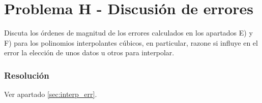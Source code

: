 \section{Problema H - Discusión de errores}

Discuta los órdenes de magnitud de los errores calculados en los apartados E) y F) para los polinomios interpolantes cúbicos, en particular, razone si influye en el error la elección de unos datos u otros para interpolar.

\subsubsection{Resolución}

Ver apartado \ref{sec:interp_err}.